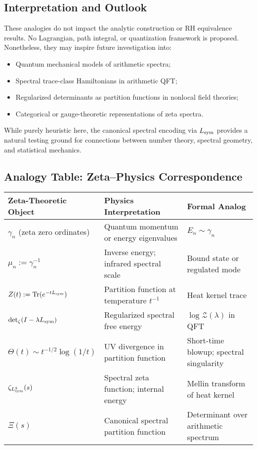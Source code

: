 \subsection*{Interpretation and Outlook}

These analogies do not impact the analytic construction or RH equivalence results. No Lagrangian, path integral, or quantization framework is proposed. Nonetheless, they may inspire future investigation into:

\begin{itemize}
  \item Quantum mechanical models of arithmetic spectra;
  \item Spectral trace-class Hamiltonians in arithmetic QFT;
  \item Regularized determinants as partition functions in nonlocal field theories;
  \item Categorical or gauge-theoretic representations of zeta spectra.
\end{itemize}

\noindent
While purely heuristic here, the canonical spectral encoding via \( L_{\mathrm{sym}} \) provides a natural testing ground for connections between number theory, spectral geometry, and statistical mechanics.

\subsection*{Analogy Table: Zeta–Physics Correspondence}

\begin{center}
\small
\renewcommand{\arraystretch}{1.3}
\begin{tabularx}{\textwidth}{|X|X|X|}
\hline
\textbf{Zeta-Theoretic Object} & \textbf{Physics Interpretation} & \textbf{Formal Analog} \\
\hline
\( \gamma_n \) (zeta zero ordinates) &
Quantum momentum or energy eigenvalues &
\( E_n \sim \gamma_n \) \\
\( \mu_n := \gamma_n^{-1} \) &
Inverse energy; infrared spectral scale &
Bound state or regulated mode \\
\( Z(t) := \operatorname{Tr}(e^{-t L_{\mathrm{sym}}}) \) &
Partition function at temperature \( t^{-1} \) &
Heat kernel trace \\
\( \det\nolimits_{\zeta}(I - \lambda L_{\mathrm{sym}}) \) &
Regularized spectral free energy &
\( \log \mathcal{Z}(\lambda) \) in QFT \\
\( \Theta(t) \sim t^{-1/2} \log(1/t) \) &
UV divergence in partition function &
Short-time blowup; spectral singularity \\
\( \zeta_{L_{\mathrm{sym}}^2}(s) \) &
Spectral zeta function; internal energy &
Mellin transform of heat kernel \\
\( \Xi(s) \) &
Canonical spectral partition function &
Determinant over arithmetic spectrum \\
\hline
\end{tabularx}
\end{center}

